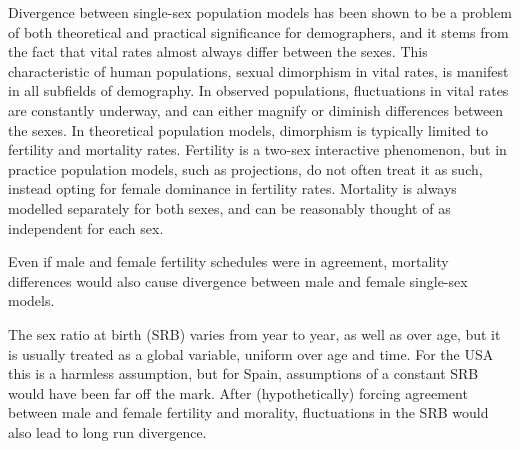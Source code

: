 Divergence between single-sex population models has been shown to be a problem
of both theoretical and practical significance for demographers, and it stems from
the fact that vital rates almost always differ between the sexes.
This characteristic of human populations, sexual dimorphism in vital rates,
is manifest in all subfields of demography. In observed populations,
fluctuations in vital rates are constantly underway, and can either magnify or
diminish differences between the sexes. In theoretical population models,
dimorphism is typically limited to fertility and mortality rates. Fertility 
is a two-sex interactive phenomenon, but in practice 
population models, such as projections, do not often treat it as
such, instead opting for female dominance in fertility rates. Mortality is
always modelled separately for both sexes, and can be reasonably thought of 
as independent for each sex. 

Even if male and female
fertility schedules were in agreement, mortality differences would also
cause divergence between male and female single-sex models. 

The sex ratio at
birth (SRB) varies from year to year, as well as over age, but it is usually
treated as a global variable, uniform over age and time. For the USA this is 
a harmless assumption, but for Spain, 
assumptions of a constant SRB would have been far off the mark. After
(hypothetically) forcing agreement between male and female fertility and
morality, fluctuations in the SRB would also lead to long run divergence.


